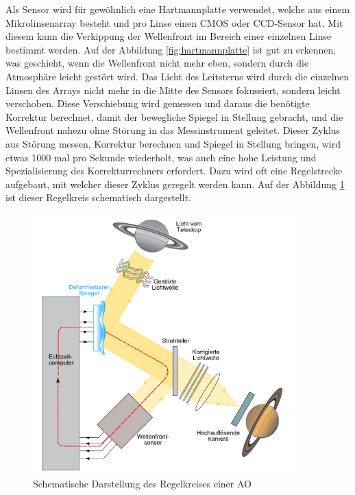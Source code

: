 \begin{refsection}
Als Sensor wird für gewöhnlich eine Hartmannplatte verwendet,
welche aus einem Mikrolinsenarray besteht und pro Linse einen CMOS
oder CCD-Sensor hat. Mit diesem kann  die Verkippung der Wellenfront
im Bereich einer einzelnen Linse bestimmt werden. Auf der Abbildung
\ref{fig:hartmannplatte} ist gut zu erkennen, was geschieht, wenn
%
%
die Wellenfront nicht mehr eben, sondern durch die Atmosphäre leicht
gestört wird. Das Licht des Leitsterns wird durch die einzelnen Linsen
des Arrays nicht mehr in die Mitte des Sensors fokussiert, sondern
leicht verschoben. Diese Verschiebung wird gemessen und daraus die
benötigte Korrektur berechnet, damit der bewegliche Spiegel in Stellung
gebracht, und die Wellenfront nahezu ohne Störung in das Messinstrument
geleitet. Dieser Zyklus aus Störung messen, Korrektur berechnen und
Spiegel in Stellung bringen, wird etwas 1000 mal pro Sekunde wiederholt,
was auch eine hohe Leistung und Spezialisierung des Korrekturrechners
erfordert. Dazu wird oft eine Regelstrecke aufgebaut, mit welcher dieser
Zyklus geregelt werden kann. Auf der Abbildung \ref{fig:schematischAO}
ist dieser Regelkreis schematisch dargestellt.

\begin{figure}
  \centering
  \includegraphics[width=0.9\textwidth]{adaptiv/images/schematichAO}
  \caption{Schematische Darstellung des Regelkreises einer AO
    \cite{robani:schematischAO}}
  \label{fig:schematischAO}
\end{figure}


\end{refsection}

